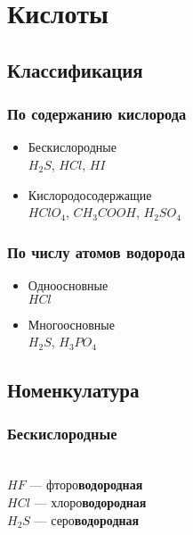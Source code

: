 \section{Кислоты}
\subsection{Классификация}
\subsubsection{По содержанию кислорода}
\begin{itemize}
    \item Бескислородные\\
        $H_2S$, $HCl$, $HI$

    \item Кислородосодержащие\\
        $HClO_4$, $CH_3COOH$, $H_2SO_4$
\end{itemize}


\subsubsection{По числу атомов водорода}
\begin{itemize}
    \item Одноосновные\\
        $HCl$

    \item Многоосновные\\
        $H_2S$, $H_3PO_4$

\end{itemize}



\subsection{Номенкулатура}
\subsubsection{Бескислородные}
\\
$HF$   --- фторо\textbf{водородная}\\
$HCl$  --- хлоро\textbf{водородная}\\
$H_2S$ --- серо\textbf{водородная}


